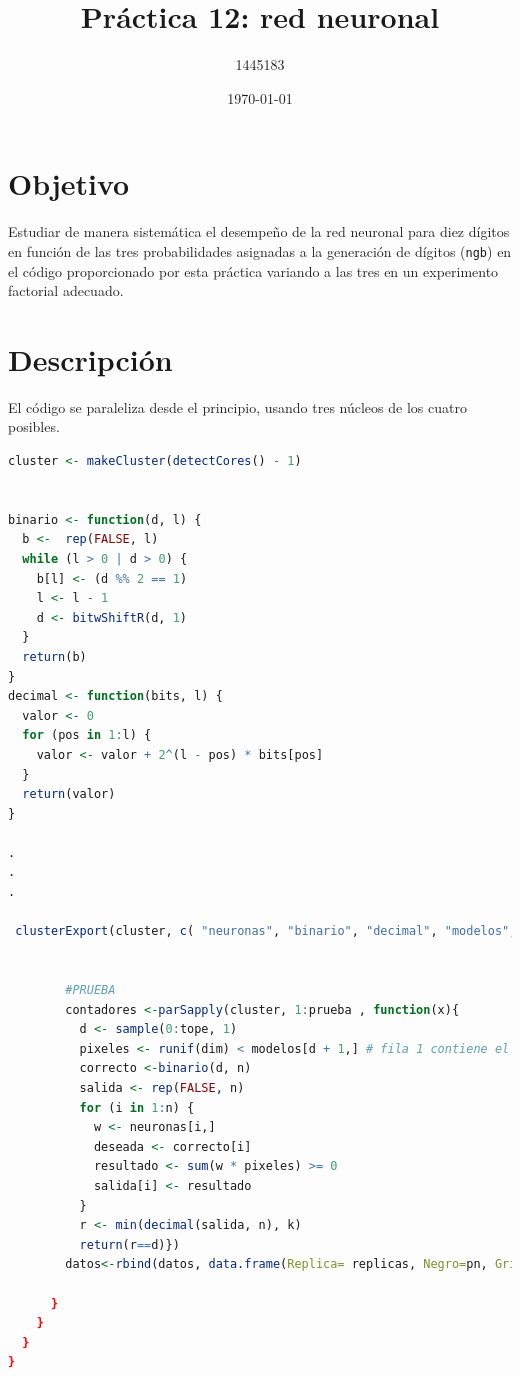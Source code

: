 \documentclass{article}
\author{1445183}
\title{Práctica 12: red neuronal}
\date{\today}
\begin{document}
\maketitle

\section{Objetivo}
Estudiar de manera sistemática el desempeño de la red neuronal para diez dígitos en función de las tres probabilidades asignadas a la generación de dígitos (\texttt{ngb}) en el código proporcionado por esta práctica \cite{elisaweb12} variando a las tres en un experimento factorial adecuado.

\section{Descripción}

El código se paraleliza desde el principio, usando tres núcleos de los cuatro posibles.

\begin{lstlisting}[language=R]
cluster <- makeCluster(detectCores() - 1)


binario <- function(d, l) {
  b <-  rep(FALSE, l)
  while (l > 0 | d > 0) {
    b[l] <- (d %% 2 == 1)
    l <- l - 1
    d <- bitwShiftR(d, 1)
  }
  return(b)
}
decimal <- function(bits, l) {
  valor <- 0
  for (pos in 1:l) {
    valor <- valor + 2^(l - pos) * bits[pos]
  }
  return(valor)
}

.
.
.

 clusterExport(cluster, c( "neuronas", "binario", "decimal", "modelos", "tope" ,"k", "dim", "n"))
        
        
        #PRUEBA 
        contadores <-parSapply(cluster, 1:prueba , function(x){ 
          d <- sample(0:tope, 1)
          pixeles <- runif(dim) < modelos[d + 1,] # fila 1 contiene el cero, etc.
          correcto <-binario(d, n)
          salida <- rep(FALSE, n)
          for (i in 1:n) {
            w <- neuronas[i,]
            deseada <- correcto[i]
            resultado <- sum(w * pixeles) >= 0
            salida[i] <- resultado
          }
          r <- min(decimal(salida, n), k) 
          return(r==d)})
        datos<-rbind(datos, data.frame(Replica= replicas, Negro=pn, Gris=pg, Blanco=pb, Porcentaje=(sum(contadores)/prueba)*100))
    
      }
    }
  }
}

\end{lstlisting}
\end{document}
